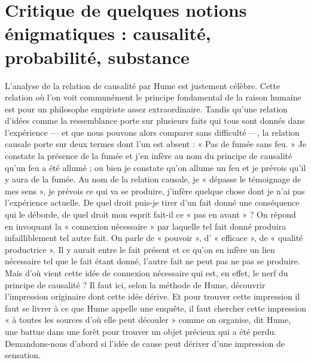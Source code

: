 
\section{Critique de quelques notions énigmatiques : causalité, probabilité, substance}
L’analyse de la relation de causalité par Hume est
justement célèbre. Cette relation où l’on voit communément le principe fondamental de la raison humaine est
pour un philosophe empiriste assez extraordinaire. Tandis
qu’une relation d’idées comme la ressemblance porte sur
plusieurs faits qui tous sont donnés dans l’expérience
— et que nous pouvons alors comparer sans difficulté —,
la relation causale porte sur deux termes dont l’un est
absent : « Pas de fumée sans feu. » Je constate la présence
de la fumée et j’en infère au nom du principe de causalité
qu’un feu a été allumé ; ou bien je constate qu’on allume
un feu et je prévois qu’il y aura de la fumée. Au nom de
la relation causale, je « dépasse le témoignage de mes
sens », je prévois ce qui va se produire, j’infère quelque
chose dont je n’ai pas l’expérience actuelle. De quel droit
puis-je tirer d’un fait donné une conséquence qui le déborde,
de quel droit mon esprit fait-il ce « pas en avant » ? On
répond en invoquant la « connexion nécessaire » par laquelle
tel fait donné produira infailliblement tel autre fait. On
parle de « pouvoir », d’ « efficace », de « qualité productrice ». Il y aurait entre le fait présent et ce qu’on en
infère un lien nécessaire tel que le fait étant donné, l’autre
fait ne peut pas ne pas se produire. Mais d’où vient cette
idée de connexion nécessaire qui est, en effet, le nerf du
principe de causalité ? Il faut ici, selon la méthode de
Hume, découvrir l’impression originaire dont cette idée
dérive. Et pour trouver cette impression il faut se livrer
à ce que Hume appelle une enquête, il faut chercher cette
impression « à toutes les sources d’où elle peut découler »
comme on organise, dit Hume, une battue dans une forêt
pour trouver un objet précieux qui a été perdu.
Demandons-nous d’abord si l’idée de cause peut dériver
d’une impression de sensation.

